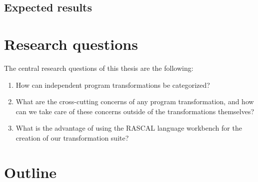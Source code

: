 \subsection{Expected results}

\section{Research questions}
The central research questions of this thesis are the following:

\begin{enumerate}
	\item How can independent program transformations be categorized?
	\item What are the cross-cutting concerns of any program transformation, and how can we take care of these concerns outside of the transformations themselves?
	\item What is the advantage of using the RASCAL language workbench\cite{Klint} for the creation of our transformation suite?
\end{enumerate}

\section{Outline}
